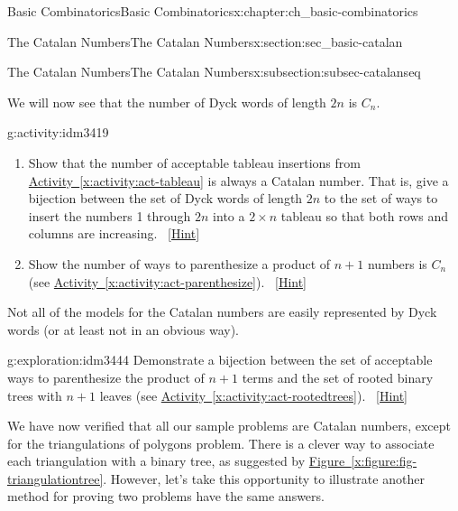 \documentclass[oneside,10pt,]{book}
\numberwithin{equation}{chapter}
\def\fivegon{%
    \coordinate (a) at (0,2.5);
    \coordinate (b) at (2,1.4);
    \coordinate (c) at (1,0);
    \coordinate (d) at (-.5,0);
    \coordinate (e) at (-2,1.5);
    \draw (a) -- (b) -- (c) -- (d) -- (e) -- (a);
  }
\newcommand{\vtx}[2]{node[fill,circle,inner sep=0pt, minimum size=4pt,label=#1:#2]{}}
\newcommand{\vr}[1]{\vtx{right}{#1}}
\newcommand{\vl}[1]{\vtx{left}{#1}}
\renewcommand{\v}{\vtx{above}{}}
\begin{document}
\begin{chapterptx}{Basic Combinatorics}{}{Basic Combinatorics}{}{}{x:chapter:ch_basic-combinatorics}
\begin{sectionptx}{The Catalan Numbers}{}{The Catalan Numbers}{}{}{x:section:sec_basic-catalan}
\begin{subsectionptx}{The Catalan Numbers}{}{The Catalan Numbers}{}{}{x:subsection:subsec-catalanseq}
\par
We will now see that the number of Dyck words of length \(2n\) is \(C_n\).%
\begin{activity}{}{g:activity:idm3419}%
\begin{enumerate}[font=\bfseries,label=(\alph*),ref=\alph*]
\item{}Show that the number of acceptable tableau insertions from \hyperref[x:activity:act-tableau]{Activity~\ref{x:activity:act-tableau}} is always a Catalan number.  That is, give a bijection between the set of Dyck words of length \(2n\) to the set of ways to insert the numbers 1 through \(2n\) into a \(2\times n\) tableau so that both rows and columns are increasing.%
\qquad~\hfill{\tiny\hyperlink{g:hint:idm3427-back}{[Hint]}}\item{}Show the number of ways to parenthesize a product of \(n+1\) numbers is \(C_n\) (see \hyperref[x:activity:act-parenthesize]{Activity~\ref{x:activity:act-parenthesize}}).%
\qquad~\hfill{\tiny\hyperlink{g:hint:idm3435-back}{[Hint]}}\end{enumerate}
\end{activity}
Not all of the models for the Catalan numbers are easily represented by Dyck words (or at least not in an obvious way).%
\begin{exploration}{}{g:exploration:idm3444}%
Demonstrate a bijection between the set of acceptable ways to parenthesize the product of \(n+1\) terms and the set of rooted binary trees with \(n+1\) leaves (see \hyperref[x:activity:act-rootedtrees]{Activity~\ref{x:activity:act-rootedtrees}}).%
\qquad~\hfill{\tiny\hyperlink{g:hint:idm3450-back}{[Hint]}}\end{exploration}
We have now verified that all our sample problems are Catalan numbers, except for the triangulations of polygons problem.  There is a clever way to associate each triangulation with a binary tree, as suggested by \hyperref[x:figure:fig-triangulationtree]{Figure~\ref{x:figure:fig-triangulationtree}}.  However, let's take this opportunity to illustrate another method for proving two problems have the same answers.%
\begin{figure}
\centering
\begin{sidebyside}{2}{0.125}{0.125}{0.25}%
\begin{sbspanel}{0.25}%

        \end{sbspanel}%
\begin{sbspanel}{0.25}%


\end{sbspanel}
\end{sidebyside}
\end{figure}
\end{subsectionptx}
\end{sectionptx}
\end{chapterptx}
\end{document}
